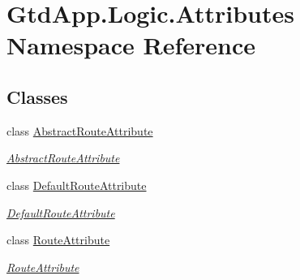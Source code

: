 \hypertarget{namespace_gtd_app_1_1_logic_1_1_attributes}{}\section{Gtd\+App.\+Logic.\+Attributes Namespace Reference}
\label{namespace_gtd_app_1_1_logic_1_1_attributes}
\subsection*{Classes}
\begin{DoxyCompactItemize}
\item 
class \mbox{\hyperlink{class_gtd_app_1_1_logic_1_1_attributes_1_1_abstract_route_attribute}{Abstract\+Route\+Attribute}}
\begin{DoxyCompactList}\small\item\em \mbox{\hyperlink{class_gtd_app_1_1_logic_1_1_attributes_1_1_abstract_route_attribute}{Abstract\+Route\+Attribute}} \end{DoxyCompactList}\item 
class \mbox{\hyperlink{class_gtd_app_1_1_logic_1_1_attributes_1_1_default_route_attribute}{Default\+Route\+Attribute}}
\begin{DoxyCompactList}\small\item\em \mbox{\hyperlink{class_gtd_app_1_1_logic_1_1_attributes_1_1_default_route_attribute}{Default\+Route\+Attribute}} \end{DoxyCompactList}\item 
class \mbox{\hyperlink{class_gtd_app_1_1_logic_1_1_attributes_1_1_route_attribute}{Route\+Attribute}}
\begin{DoxyCompactList}\small\item\em \mbox{\hyperlink{class_gtd_app_1_1_logic_1_1_attributes_1_1_route_attribute}{Route\+Attribute}} \end{DoxyCompactList}\end{DoxyCompactItemize}
